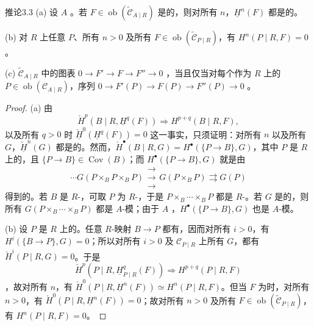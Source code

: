 \begin{SGAresult}{推论}{3.3}
(a) 设 $A$ 。若 $F\in\operatorname{ob}(\widetilde{\mathcal C}_{A\mid R})$ 是的，则对所有 $n$，$\underline H^n(F)$ 都是的。

(b) 对 $R$ 上任意 $P$、所有 $n>0$ 及所有 $F\in\operatorname{ob}(\widetilde{\mathcal C}_{P\mid R})$，有 $H^n(P\mid R,F)=0$。

(c) $\widetilde{\mathcal C}_{A\mid R}$ 中的图表 $0\to F'\to F\to F''\to0$ ，当且仅当对每个作为 $R$ 上的 $P\in\operatorname{ob}(\mathcal C_{A\mid R})$，序列 $0\to F'(P)\to F(P)\to F''(P)\to0$ 。
\end{SGAresult}
\begin{proof}
(a) 由
\[\check H^p(B\mid R,\underline H^q(F))\Longrightarrow H^{p+q}(B\mid R,F),\]
以及所有 $q>0$ 时 $\check{\underline H}^0(\underline H^q(F))=0$ 这一事实，只须证明：对所有 $n$ 以及所有 $G$，$\check{\underline H}^n(G)$ 都是的。然而，$\check H^{\bullet}(B\mid R,G)=H^{\bullet}(\{P\to B\},G)$，其中 $P$ 是 $R$ 上的，且 $\{P\to B\}\in\operatorname{Cov}(B)$；而 $H^{\bullet}(\{P\to B\},G)$ 就是由
\[\cdots G(P\mathbin{\times_B}P\mathbin{\times_B}P)\mathrel{\substack{\longrightarrow\\[-.8ex]\longrightarrow\\[-.8ex]\longrightarrow}} G(P\mathbin{\times_B}P)\rightrightarrows G(P)\]
得到的。若 $B$ 是 $R$-，可取 $P$ 为 $R$-，于是 $P\mathbin{\times_B}\cdots\mathbin{\times_B}P$ 都是 $R$-。若 $G$ 是的，则所有 $G(P\mathbin{\times_B}\cdots\mathbin{\times_B}P)$ 都是 $A$-模；由于 $A$ ，$H^{\bullet}(\{P\to B\},G)$ 也是 $A$-模。

(b) 设 $P$ 是 $R$ 上的。任意 $R$-映射 $B\to P$ 都有，因而对所有 $i>0$，有 $H^i(\{B\to P\},G)=0$；所以对所有 $i>0$ 及 $\mathcal C_{P\mid R}$ 上所有 $G$，都有 $\check H^i(P\mid R,G)=0$。于是
\[\check H^p(P\mid R,\underline H^q_{P\mid R}(F))\Longrightarrow H^{p+q}(P\mid R,F)\]
，故对所有 $n$，有 $\check H^0(P\mid R,\underline H^n(F))\simeq H^n(P\mid R,F)$。但当 $F$ 为时，对所有 $n>0$，有 $\check H^0(P\mid R,\underline H^n(F))=0$；故对所有 $n>0$ 及所有 $F\in\operatorname{ob}(\widetilde{\mathcal C}_{P\mid R})$，有 $H^n(P\mid R,F)=0$。


\end{proof}
